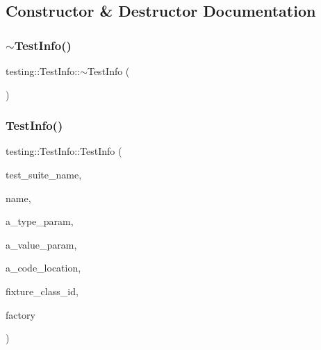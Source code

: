 \subsection{Constructor \& Destructor Documentation}
\mbox{\label{classtesting_1_1_test_info_a8d382c1b1b511f0d9112c14684809852}} 
\subsubsection{\texorpdfstring{$\sim$TestInfo()}{~TestInfo()}\hspace{0.1cm}{\footnotesize\ttfamily [1/3]}}
{\footnotesize\ttfamily testing\+::\+Test\+Info\+::$\sim$\+Test\+Info (\begin{DoxyParamCaption}{ }\end{DoxyParamCaption})}

\mbox{\label{classtesting_1_1_test_info_aa652b2ec74957083637ece79297b274b}} 
\subsubsection{\texorpdfstring{TestInfo()}{TestInfo()}\hspace{0.1cm}{\footnotesize\ttfamily [1/3]}}
{\footnotesize\ttfamily testing\+::\+Test\+Info\+::\+Test\+Info (\begin{DoxyParamCaption}\item[{const std\+::string \&}]{test\+\_\+suite\+\_\+name,  }\item[{const std\+::string \&}]{name,  }\item[{const char $\ast$}]{a\+\_\+type\+\_\+param,  }\item[{const char $\ast$}]{a\+\_\+value\+\_\+param,  }\item[{\mbox{\hyperlink{structtesting_1_1internal_1_1_code_location}{internal\+::\+Code\+Location}}}]{a\+\_\+code\+\_\+location,  }\item[{\mbox{\hyperlink{namespacetesting_1_1internal_a38c435cbab5f8b784e2e7f3356cab242}{internal\+::\+Type\+Id}}}]{fixture\+\_\+class\+\_\+id,  }\item[{\mbox{\hyperlink{classtesting_1_1internal_1_1_test_factory_base}{internal\+::\+Test\+Factory\+Base}} $\ast$}]{factory }\end{DoxyParamCaption})\hspace{0.3cm}{\ttfamily [private]}}

